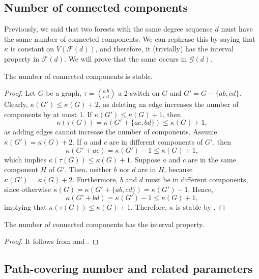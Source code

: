 \documentclass{BICA}
\begin{document}
\subsection{Number of connected components}\label{sectionnumberofcomponents}

Previously, we said that two forests with the same degree sequence $d$ must have the same number of connected components. We can rephrase this by saying that $\kappa$ is constant on $V(\mathcal{F}(d))$, and therefore, it (trivially) has the interval property in $\mathcal{F}(d)$. We will prove that the same occurs in $\mathcal{G}(d)$.

\begin{theorem}\label{kappa_stable}
The number of connected components is stable.
\end{theorem}

\begin{proof}
Let \(G\) be a graph, \(\tau={{a \ b}\choose{c \ d}}\) a 2-switch on \(G\) and $G'=G-\{ab,cd\}$. Clearly, $\kappa(G')\leq \kappa(G)+2$, as deleting an edge increases the number of components by at most 1. If $\kappa(G')\leq \kappa(G)+1$, then
\[ \kappa(\tau(G))=\kappa(G'+\{ac,bd\})\leq \kappa(G)+1, \]
as adding edges cannot increase the number of components. Assume $\kappa(G')=\kappa(G)+2$. If $a$ and $c$ are in different components of $G'$, then
\[ \kappa(G'+ac)=\kappa(G')-1\leq \kappa(G)+1, \]
which implies $\kappa(\tau(G))\leq \kappa(G)+1$. Suppose $a$ and $c$ are in the same component $H$ of $G'$. Then, neither $b$ nor $d$ are in $H$, because $\kappa(G')=\kappa(G)+2$. Furthermore, $b$ and $d$ must be in different components, since otherwise $\kappa(G)=\kappa(G'+\{ab,cd\})=\kappa(G')-1$.
Hence,
\[ \kappa(G'+bd)=\kappa(G')-1\leq \kappa(G)+1, \]
implying that $\kappa(\tau(G))\leq \kappa(G)+1$. Therefore, $\kappa$ is stable by .
\end{proof}

\begin{theorem}
	The number of connected components has the interval property.
\end{theorem}

\begin{proof}
	It follows from  and .
\end{proof}

\subsection{Path-covering number and related parameters}\label{sectionpathcover}
\end{document}
